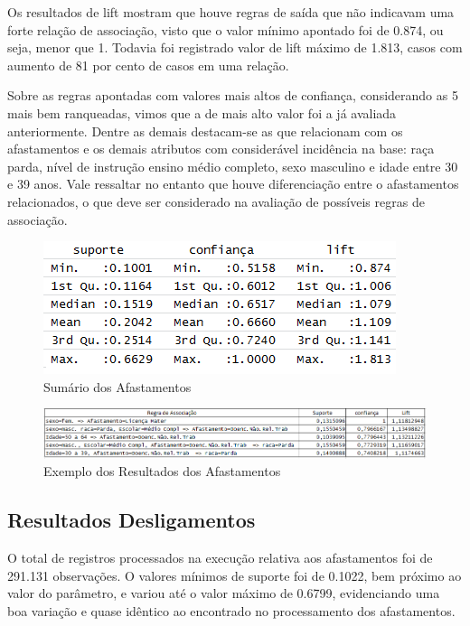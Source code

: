 \documentclass[12pt]{article}
\begin{document}
Os resultados de lift mostram que houve regras de saída que não indicavam uma forte relação de associação, visto que o valor mínimo apontado foi de 0.874, ou seja, menor que 1. Todavia foi registrado valor de lift máximo de 1.813, casos com aumento de 81 por cento  de casos em uma relação.

Sobre as regras apontadas com valores mais altos de confiança, considerando as 5 mais bem ranqueadas, vimos que a de mais alto valor foi a já avaliada anteriormente. Dentre as demais destacam-se as que relacionam com os afastamentos e os demais atributos com considerável incidência na base: raça parda, nível de instrução ensino médio completo, sexo masculino e idade entre 30 e 39 anos. Vale ressaltar no entanto que houve diferenciação entre o afastamentos relacionados, o que deve ser considerado na avaliação de possíveis regras de associação.

\FloatBarrier
\begin{figure}[!htb]
\centering
\includegraphics[width=0.8                                          \textwidth]{Sumary_Result_Afasta.png}
\caption{Sumário dos Afastamentos}
\label{fig:exampleFig6}
\end{figure}

\FloatBarrier
\begin{figure}[!htb]
\centering
\includegraphics[width=1.0\textwidth]{top5_Afastamento.png}
\caption{Exemplo dos Resultados dos Afastamentos}
\label{fig:exampleFig7}
\end{figure}


\subsection{Resultados Desligamentos}

O total de registros processados na execução relativa aos afastamentos foi de 291.131 observações.
O valores mínimos de suporte foi de 0.1022, bem próximo ao valor do parâmetro, e variou até o valor máximo de 0.6799, evidenciando uma boa variação e quase idêntico ao encontrado no processamento dos afastamentos.
\end{document}
